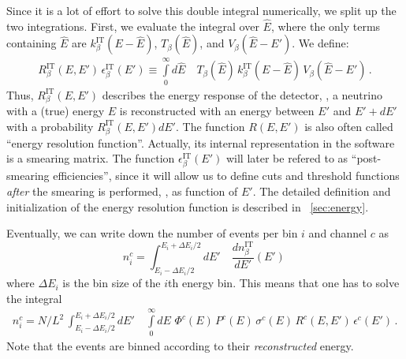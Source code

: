 Since it is a lot of effort to solve this double integral numerically,
we split up the two integrations. First, we evaluate the integral over
$\hat{E}$, where the only terms containing $\hat{E}$ are
$k_\beta^{\text{IT}}(E-\hat{E})$,  $ T_\beta(\hat{E})$, and 
$ V_\beta(\hat{E}-E')$. We define:
\begin{eqnarray}
\label{eq:e_res} 
R_\beta^{\text{IT}}(E,E')\,\epsilon_\beta^{\text{IT}}(E')
 \equiv
\int\limits_0^\infty d\hat{E} \quad T_\beta(\hat{E})\,k_\beta^{\text{IT}}(E-\hat{E})
\,V_\beta(\hat{E}-E')\,. 
\end{eqnarray}
Thus, $R_\beta^{\text{IT}}(E,E')$ describes the energy response of 
the detector, \ie , a neutrino with a (true) energy $E$ is reconstructed
with an energy between $E'$ and $E'+dE'$ with a probability
$R_\beta^{\text{IT}}(E,E') dE'$. The function $R(E,E')$ is also often called ``energy resolution function''. Actually, its internal representation
in the software is a smearing matrix. The function $\epsilon_\beta^{\text{IT}}(E')$ will later be refered to as ``post-smearing efficiencies'', since it will allow us to define cuts and threshold functions {\em after} the smearing is performed, \ie, as function of $E'$. The detailed definition and initialization of the energy resolution function is described in \Sec~\ref{sec:energy}.

Eventually, we can write down the number of events per bin $i$  and channel $c$ as
\begin{equation}
\label{eq:channel}
n_i^c=\int_{E_i-\Delta E_i/2}^{E_i+\Delta E_i/2} dE' \quad
\frac{dn_{\beta}^{\text{IT}}}{dE'} (E') \,
\end{equation}
where $\Delta E_i$ is the bin size of the $i$th energy bin.
This means that one has to solve the integral
\begin{eqnarray}
\label{eq:events_bin}
n_i^c=N/L^2\,\int_{E_i-\Delta E_i/2}^{E_i+\Delta E_i/2} dE' 
\quad \int\limits_0^\infty dE \,\, \Phi^c(E)\,
P^c(E)\,
\sigma^c(E)\,
R^c(E,E')\,
\epsilon^c(E')\,.
\end{eqnarray} 
Note that the events are binned according to their \emph{reconstructed} energy.

